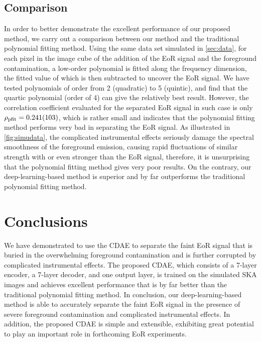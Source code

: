 \documentclass[letters,a4paper,fleqn,usenatbib]{mnras}
\newcommand{\R}[1]{\mathrm{#1}}
\begin{document}
\subsection{Comparison}
\label{sec:comparison}

In order to better demonstrate the excellent performance of our proposed
method, we carry out a comparison between our method and the traditional
polynomial fitting method.
Using the same data set simulated in \autoref{sec:data}, for each pixel
in the image cube of the addition of the EoR signal and the foreground
contamination, a low-order polynomial is fitted along the frequency
dimension, the fitted value of which is then subtracted to uncover the
EoR signal.
We have tested polynomials of order from 2 (quadratic) to 5 (quintic),
and find that the quartic polynomial (order of 4) can give the
relatively best result.
However, the correlation coefficient evaluated for the separated EoR
signal in such case is only $\rho_{\R{pfit}} = \num{0.241 +- 0.103}$,
which is rather small and indicates that the polynomial fitting method
performs very bad in separating the EoR signal.
As illustrated in \autoref{fig:simudata}, the complicated instrumental
effects seriously damage the spectral smoothness of the foreground
emission, causing rapid fluctuations of similar strength with or even
stronger than the EoR signal, therefore, it is unsurprising that the
polynomial fitting method gives very poor results.
On the contrary, our deep-learning-based method is superior and
by far outperforms the traditional polynomial fitting method.


\section{Conclusions}
\label{sec:conclusions}

We have demonstrated to use the CDAE to separate the faint EoR signal
that is buried in the overwhelming foreground contamination and is
further corrupted by complicated instrumental effects.
The proposed CDAE, which consists of a 7-layer encoder, a 7-layer
decoder, and one output layer, is trained on the simulated SKA images
and achieves excellent performance that is by far better than the
traditional polynomial fitting method.
In conclusion, our deep-learning-based method is able to accurately
separate the faint EoR signal in the presence of severe foreground
contamination and complicated instrumental effects.
In addition, the proposed CDAE is simple and extensible, exhibiting
great potential to play an important role in forthcoming EoR
experiments.
\end{document}
